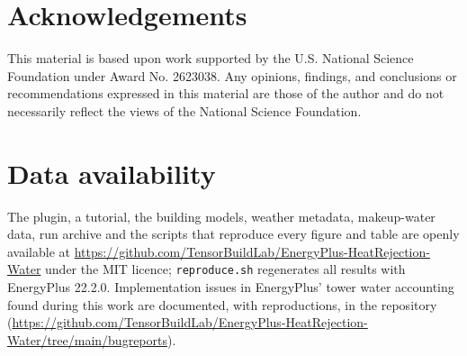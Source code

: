 \documentclass[preprint,12pt]{elsarticle}
\begin{document}
\section*{Acknowledgements}
This material is based upon work supported by the U.S. National Science Foundation under Award No. 2623038. Any
opinions, findings, and conclusions or recommendations expressed in this material are those of the author and do not
necessarily reflect the views of the National Science Foundation.

\section*{Data availability}
The plugin, a tutorial, the building models, weather metadata, makeup-water data, run archive and the scripts that
reproduce every figure and table are openly available at
\url{https://github.com/TensorBuildLab/EnergyPlus-HeatRejection-Water} under the MIT licence;
\texttt{reproduce.sh} regenerates all results with EnergyPlus 22.2.0. Implementation issues in EnergyPlus' tower water
accounting found during this work are documented, with reproductions, in the repository
(\url{https://github.com/TensorBuildLab/EnergyPlus-HeatRejection-Water/tree/main/bugreports}).

\appendix
\end{document}
